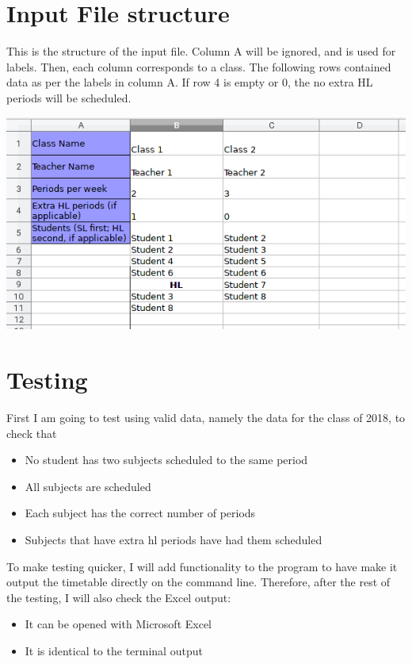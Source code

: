 \documentclass[12pt]{article}
\begin{document}
\section*{Input File structure}
This is the structure of the input file. Column A will be ignored, and is used for labels.
Then, each column corresponds to a class. The following rows contained data as per the
labels in column A. If row 4 is empty or 0, the no extra HL periods will be scheduled. 

\includegraphics[width=\textwidth]{data_file_structure.png}

\section*{Testing}

First I am going to test using valid data, namely the data for the class of 2018, to check
that
%
\begin{itemize}
    \item No student has two subjects scheduled to the same period
    \item All subjects are scheduled
    \item Each subject has the correct number of periods
    \item Subjects that have extra hl periods have had them scheduled
\end{itemize}
%

To make testing quicker, I will add functionality to the program to have make it output the
timetable directly on the command line. Therefore, after the rest of the testing, I will
also check the Excel output:
%
\begin{itemize}
    \item It can be opened with Microsoft Excel
    \item It is identical to the terminal output
\end{itemize}
%
\end{document}
